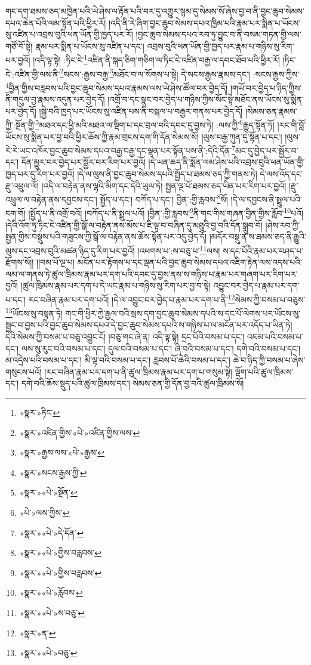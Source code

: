གང་དག་ཐམས་ཅད་མཁྱེན་པའི་ཡེ་ཤེས་ལ་རྟོན་པའི་བར་དུ་འགྱུར་སྙམ་དུ་སེམས་སོ་ཞེས་བྱ་བ་ནི་བྱང་ཆུབ་སེམས་དཔའ་ཆེན་པོའི་ལམ་སྟོན་པའི་ཕྱིར་རོ། །འདི་ནི་རེ་ཞིག་བྱང་ཆུབ་སེམས་དཔའ་ཁྱིམ་པའི་རྣམ་པར་སྨིན་པ་ཡོངས་སུ་འཛིན་པ་འབྲས་བུའི་ཕན་ཡོན་གྱི་ཁྱད་པར་རོ། །བྱང་ཆུབ་སེམས་དཔའ་རབ་ཏུ་བྱུང་བ་ནི་བསམ་གཏན་གྱི་ལས་གཙོ་བོ་སྟེ། རྣམ་པར་སྨིན་པ་ཡོངས་སུ་འཛིན་པ་དང་། འབྲས་བུའི་ཕན་ཡོན་གྱི་ཁྱད་པར་རྣམ་པ་གཉིས་སུ་རིག་པར་བྱའོ། །འདི་ལྟ་སྟེ། :ཏིང་ངེ་\footnote{«སྣར་»ཏིང་}འཛིན་ནི་སྐད་ཅིག་གཅིག་ལ་ཏིང་ངེ་འཛིན་བརྒྱ་ལ་དབང་ཐོབ་པའི་ཕྱིར་རོ། །ཏིང་ངེ་:འཛིན་གྱི་ལས་ནི་\footnote{«སྣར་»འཛིན་གྱིས་«པེ་»འཛིན་གྱིས་ལས་}སངས་:རྒྱས་བརྒྱ་\footnote{«སྣར་»རྒྱས་ལས་«པེ་»རྒྱས་}མཐོང་བ་ལ་སོགས་པ་སྟེ། དེ་སངས་རྒྱས་རྣམས་དང་། :སངས་རྒྱས་ཀྱིས་\footnote{«སྣར་»སངས་རྒྱས་ཀྱི་}བྱིན་གྱིས་བརླབས་པའི་བྱང་ཆུབ་སེམས་དཔའ་རྣམས་ལས་ཡེ་ཤེས་ཚོལ་བར་བྱེད་དོ། །གཡོ་བར་བྱེད་པ་ཉིད་ཀྱིས་ནི་གདུལ་བྱ་རྣམས་འདུན་པར་བྱེད་དོ། །འགྲོ་བ་དང་སྣང་བར་བྱེད་པ་གཉིས་ཀྱིས་སོང་སྟེ་མཐོང་ནས་ཡོངས་སུ་སྨིན་པར་བྱེད་དོ། །སྐྱེ་བའི་ཁྱད་པར་ཡོངས་སུ་འཛིན་པས་ནི་བསྐལ་པ་བརྒྱར་གནས་པར་བྱེད་དོ། །སེམས་ཅན་རྣམས་ཀྱི་:སྔོན་གྱི་\footnote{«སྣར་»«པེ་»སྔོན་}མཐའ་དང་ཕྱི་མའི་མཐའ་ལ་སྡིག་པ་དང་བྲལ་བའི་དབང་དུ་བྱས་ཏེ། :ལས་ཀྱི་\footnote{«པེ་»ལས་ཀྱིས་}རྒྱུད་སྟོན་ཏོ། །རང་གི་བློ་ཡོངས་སུ་སྨིན་པར་བྱ་བའི་ཕྱིར་ཆོས་ཀྱི་རྣམ་གྲངས་དག་གི་དོན་སེམས་སོ། །ལུས་བརྒྱ་ཀུན་དུ་སྟོན་པ་དང་། །ལུས་རེ་རེ་ཡང་འཁོར་བྱང་ཆུབ་སེམས་དཔའ་བརྒྱ་བརྒྱ་དང་ལྡན་པར་སྟོན་པས་ནི་:དེའི་དོན་\footnote{«སྣར་»«པེ་»དེ་དོན་}མང་དུ་བྱེད་པར་སྦྱོར་བ་དང་། དོན་མྱུར་བར་བྱེད་པར་སྦྱོར་བར་རིག་པར་བྱའོ། །དེ་ཡན་ཆད་ནི་སྨོན་ལམ་ཤེས་པའི་འབྲས་བུའི་ཕན་ཡོན་གྱི་ཁྱད་པར་དུ་རིག་པར་བྱའོ། །དེ་ལ་ལུས་ནི་བྱང་ཆུབ་སེམས་དཔའི་སྤྱོད་པ་ཐམས་ཅད་ཀྱི་གནས་ཏེ། དེ་ལས་འོད་དང་རྫུ་འཕྲུལ་ལོ། །འདི་ལ་བརྟེན་ནས་ལྷའི་མིག་དང་དེའི་ཡུལ་ཏེ། སྤྱན་ལྔ་པོ་ཐམས་ཅད་ཡིན་པར་རིག་པར་བྱའོ། །རྫུ་འཕྲུལ་ལ་བརྟེན་ནས་དབྱངས་དང་། སྤྱོད་པ་དང་། བཀོད་པ་དང་། བྱིན་:གྱི་རླབས་\footnote{«སྣར་»«པེ་»གྱིས་བརླབས་}སོ། །དེ་ལ་དབྱངས་ནི་སྤྲུལ་པའི་ངག་གོ། །སྤྱོད་པ་ནི་འགྲོ་བའོ། །བཀོད་པ་ནི་སྤྲུལ་པའོ། །བྱིན་:གྱི་རླབས་\footnote{«སྣར་»«པེ་»གྱིས་བརླབས་}ནི་གང་གིས་གཞན་བྱིན་གྱིས་རློབ་\footnote{«སྣར་»«པེ་»རློབས་}པའོ། །དེའི་འོག་ཏུ་ཏིང་ངེ་འཛིན་གྱི་སྒོ་ལ་བརྟེན་ནས་མོས་པ་ཇི་ལྟ་བ་བཞིན་དུ་མཐུའི་བྱ་བའི་དོན་སྒྲུབ་བོ། །ཤེས་རབ་ཀྱི་སྤྱན་གྱིས་བསྡུས་པའི་གཟུངས་ཀྱི་སྒོ་ལ་བརྟེན་ནས་ཆོས་སྟོན་པར་འདུ་བྱེད་དོ། །མདོར་བསྡུ་ན་ས་ཐམས་ཅད་ནི་རྒྱུའི་ལུས་དང་འབྲས་བུའི་མཚན་ཉིད་དུ་རིག་པར་བྱའོ། །འཕགས་པ་:ས་བཅུ་པ་\footnote{«སྣར་»«པེ་»ས་བཅུ་}ལས། ས་དང་པོའི་རྣམ་པར་བཤད་པ་རྫོགས་སོ།། །།བམ་པོ་ལྔ་པ། མངོན་པར་རྟོགས་པ་དང་ལྡན་པའི་བྱང་ཆུབ་སེམས་དཔའ་འཇིག་རྟེན་ལས་འདས་པའི་ལམ་ལ་གནས་ཏེ་ཚུལ་ཁྲིམས་རྣམ་པར་དག་པའི་དབང་དུ་བྱས་ནས་ས་གཉིས་པ་རྣམ་པར་གཞག་པར་རིག་པར་བྱའོ། །ཚུལ་ཁྲིམས་རྣམ་པར་དག་པ་དེ་ཡང་རྣམ་པ་གཉིས་སུ་རིག་པར་བྱ་བ་སྟེ། འབྱུང་བར་བྱེད་པ་རྣམ་པར་དག་པ་དང་། རང་བཞིན་རྣམ་པར་དག་པའོ། །དེ་ལ་འབྱུང་བར་བྱེད་པ་རྣམ་པར་དག་པ་ནི་\footnote{«སྣར་»ན་}སེམས་ཀྱི་བསམ་པ་བཅུས་\footnote{«སྣར་»«པེ་»བཅུ་}ཡོངས་སུ་བསྟན་ཏེ། གང་གི་ཕྱིར་ཀྱེ་རྒྱལ་བའི་སྲས་དག་བྱང་ཆུབ་སེམས་དཔའི་ས་དང་པོ་ལེགས་པར་ཡོངས་སུ་སྦྱང་བ་བྱས་པའི་བྱང་ཆུབ་སེམས་དཔའ་དེ་བྱང་ཆུབ་སེམས་དཔའི་ས་གཉིས་པ་ལ་མངོན་པར་འདོད་པ་ཡིན་ཏེ། དེའི་སེམས་ཀྱི་བསམ་པ་བཅུ་འབྱུང་ངོ། །བཅུ་གང་ཞེ་ན། འདི་ལྟ་སྟེ། དྲང་པོའི་བསམ་པ་དང་། འཇམ་པའི་བསམ་པ་དང་། ལས་སུ་རུང་བའི་བསམ་པ་དང་། དུལ་བའི་བསམ་པ་དང་། ཞི་བའི་བསམ་པ་དང་། དགེ་བའི་བསམ་པ་དང་། མ་འདྲེས་པའི་བསམ་པ་དང་། མི་ལྟ་བའི་བསམ་པ་དང་། རླབས་པོ་ཆེའི་བསམ་པ་དང་། ཆེ་བ་ཉིད་ཀྱི་བསམ་པ་ཞེས་གསུངས་པའོ། །རང་བཞིན་རྣམ་པར་དག་པ་ནི་ཚུལ་ཁྲིམས་རྣམ་པར་དག་པ་གསུམ་སྟེ། ལྡོག་པའི་ཚུལ་ཁྲིམས་དང་། དགེ་བའི་ཆོས་སྡུད་པའི་ཚུལ་ཁྲིམས་དང་། སེམས་ཅན་གྱི་དོན་བྱ་བའི་ཚུལ་ཁྲིམས་སོ། 